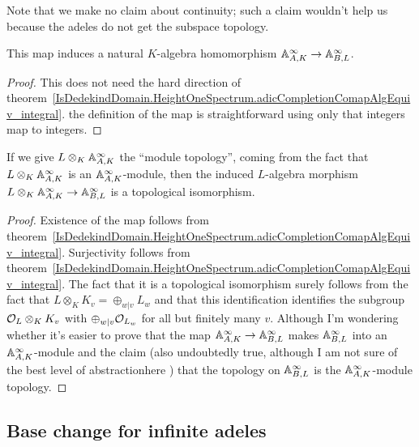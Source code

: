 Note that we make no claim about continuity; such a claim wouldn't help
us because the adeles do not get the subspace topology.

\begin{theorem} This map induces a natural $K$-algebra homomorphism
  $\mathbb{A}_{A,K}^\infty\to\mathbb{A}_{B,L}^\infty$.
  \label{DedekindDomain.FiniteAdeleRing.baseChange}
  \leanok
\end{theorem}
\begin{proof}
  This does not need the hard direction of
  theorem~\ref{IsDedekindDomain.HeightOneSpectrum.adicCompletionComapAlgEquiv_integral}.
  the definition of the map is straightforward using only that integers map
  to integers.
\end{proof}

\begin{theorem}
  \label{DedekindDomain.FiniteAdeleRing.baseChangeAlgEquiv}
  \leanok
  If we give $L\otimes_K\mathbb{A}_{A,K}^\infty$ the ``module topology'', coming from the fact
  that $L\otimes_K\mathbb{A}_{A,K}^\infty$ is an $\mathbb{A}_{A,K}^\infty$-module, then the induced
  $L$-algebra morphism
  $L\otimes_K\mathbb{A}_{A,K}^\infty\to\mathbb{A}_{B,L}^\infty$ is a topological isomorphism.
\end{theorem}
\begin{proof}
  Existence of the map follows from
  theorem~\ref{IsDedekindDomain.HeightOneSpectrum.adicCompletionComapAlgEquiv_integral}.
  Surjectivity follows from
  theorem~\ref{IsDedekindDomain.HeightOneSpectrum.adicCompletionComapAlgEquiv_integral}.
  The fact that it is a topological isomorphism surely follows from the fact that
  $L\otimes_K K_v=\oplus_{w|v}L_w$ and that this identification identifies
  the subgroup $\mathcal{O}_L\otimes_K K_v$ with $\oplus_{w|v}\mathcal{O}_{L_w}$ for all
  but finitely many $v$. Although I'm wondering whether it's easier to prove
  that the map $\mathbb{A}_{A,K}^\infty\to\mathbb{A}_{B,L}^\infty$ makes $\mathbb{A}_{B,L}^\infty$
  into an $\mathbb{A}_{A,K}^\infty$-module and the claim (also undoubtedly true, although
  I am not sure of the best level of abstractionhere ) that the topology on
  $\mathbb{A}_{B,L}^\infty$ is the $\mathbb{A}_{A,K}^\infty$-module topology.
\end{proof}

\subsection{Base change for infinite adeles}

